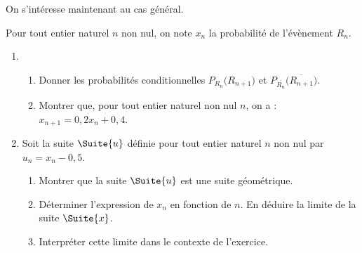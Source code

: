 On s’intéresse maintenant au cas général.

Pour tout entier naturel $n$ non nul, on note $x_n$ la probabilité de l’évènement $R_n$.

\begin{enumerate}
	\item 
	\begin{enumerate}
		\item Donner les probabilités conditionnelles $P_{R_n} \big(R_{n+1}\big)$ et $P_{\overline{R_n}} \big(\overline{R_{n+1}}\big)$.
		\item Montrer que, pour tout entier naturel non nul $n$, on a : $x_{n+1}=0,2x_n+0,4$.
	\end{enumerate}
	\item Soit la suite $\Suite{u}$ définie pour tout entier naturel $n$ non nul par $u_n = x_n - 0,5$.
	\begin{enumerate}
		\item Montrer que la suite $\Suite{u}$ est une suite géométrique.
		\item Déterminer l’expression de $x_n$ en fonction de $n$. En déduire la limite de la suite $\Suite{x}$.
		\item Interpréter cette limite dans le contexte de l’exercice.
	\end{enumerate}
\end{enumerate}